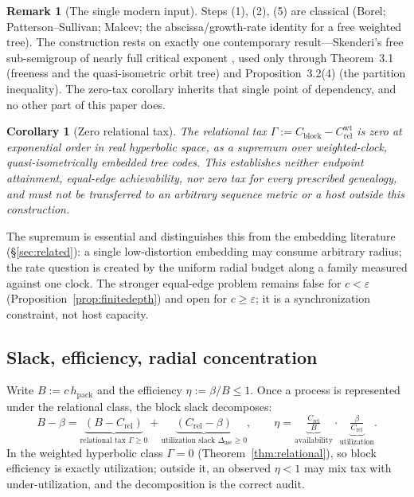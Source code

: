 \documentclass[11pt,reqno]{amsart}
\theoremstyle{plain}
\newtheorem{corollary}[theorem]{Corollary}
\theoremstyle{definition}
\newtheorem{remark}[theorem]{Remark}
\newcommand{\hpack}{h_{\mathrm{pack}}}
\newcommand{\Crel}{C_{\mathrm{rel}}}
\newcommand{\Cblock}{C_{\mathrm{block}}}
\newcommand{\eps}{\varepsilon}
\begin{document}
\begin{remark}[The single modern input]
Steps (1), (2), (5) are classical (Borel; Patterson--Sullivan; Malcev; the abscissa/growth-rate identity for a free weighted tree). The construction rests on exactly one contemporary result---Skenderi's free sub-semigroup of nearly full critical exponent \cite{skenderi2026}, used only through Theorem~3.1 (freeness and the quasi-isometric orbit tree) and Proposition~3.2(4) (the partition inequality). The zero-tax corollary inherits that single point of dependency, and no other part of this paper does.
\end{remark}

\begin{corollary}[Zero relational tax]\label{cor:zerotax}
The relational tax $\Gamma:=\Cblock-\Crel^{\mathrm{wt}}$ is zero at exponential order in real hyperbolic space, as a supremum over weighted-clock, quasi-isometrically embedded tree codes. This establishes neither endpoint attainment, equal-edge achievability, nor zero tax for every prescribed genealogy, and must not be transferred to an arbitrary sequence metric or a host outside this construction.
\end{corollary}

The supremum is essential and distinguishes this from the embedding literature (\S\ref{sec:related}): a single low-distortion embedding may consume arbitrary radius; the rate question is created by the uniform radial budget along a family measured against one clock. The stronger equal-edge problem remains false for $c<\eps$ (Proposition~\ref{prop:finitedepth}) and open for $c\ge\eps$; it is a synchronization constraint, not host capacity.

\subsection{Slack, efficiency, radial concentration}\label{sec:slack}

Write $B:=c\,\hpack$ and the efficiency $\eta:=\beta/B\le1$. Once a process is represented under the relational class, the block slack decomposes:
\[
B-\beta=\underbrace{(B-\Crel)}_{\text{relational tax }\Gamma\ge0}+\underbrace{(\Crel-\beta)}_{\text{utilization slack }\Delta_{\mathrm{use}}\ge0},\qquad
\eta=\underbrace{\tfrac{\Crel}{B}}_{\text{availability}}\cdot\underbrace{\tfrac{\beta}{\Crel}}_{\text{utilization}}.
\]
In the weighted hyperbolic class $\Gamma=0$ (Theorem~\ref{thm:relational}), so block efficiency is exactly utilization; outside it, an observed $\eta<1$ may mix tax with under-utilization, and the decomposition is the correct audit.
\end{document}
